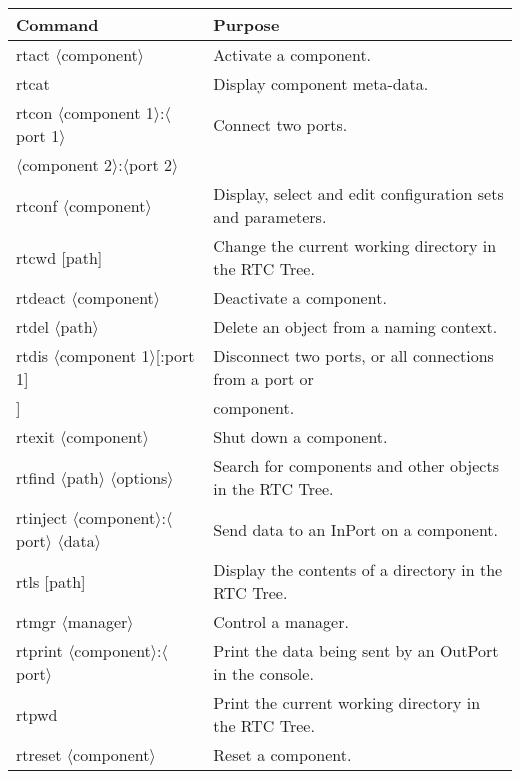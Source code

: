 \documentclass[a4paper,10pt]{article}
\newenvironment{Japanese}{%
  \CJKfamily{min}%
  \CJKtilde
  \CJKnospace}{}
\begin{document}

\begin{table}
  \centering
  \begin{tabularx}{\columnwidth}{ll}
    \toprule
    Command & Purpose \\
    \midrule
    rtact $\langle$component$\rangle$ & Activate a component. \\
    rtcat & Display component meta-data. \\
    rtcon $\langle$component 1$\rangle$:$\langle$port 1$\rangle$ & Connect two ports. \\
    \qquad$\langle$component 2$\rangle$:$\langle$port 2$\rangle$ & \\
    rtconf $\langle$component$\rangle$ & Display, select and edit configuration sets and parameters. \\
    rtcwd [path] & Change the current working directory in the RTC Tree. \\
    rtdeact $\langle$component$\rangle$ & Deactivate a component. \\
    rtdel $\langle$path$\rangle$ & Delete an object from a naming context. \\
    rtdis $\langle$component 1$\rangle$[:port 1] & Disconnect two ports, or all connections from a port or \\
    \qquad[component 2[:port 2]] & component. \\
    rtexit $\langle$component$\rangle$ & Shut down a component. \\
    rtfind $\langle$path$\rangle$ $\langle$options$\rangle$ & Search for components and other objects in the RTC Tree. \\
    rtinject $\langle$component$\rangle$:$\langle$port$\rangle$ $\langle$data$\rangle$ & Send data to an InPort on a component. \\
    rtls [path] & Display the contents of a directory in the RTC Tree. \\
    rtmgr $\langle$manager$\rangle$ & Control a manager. \\
    rtprint $\langle$component$\rangle$:$\langle$port$\rangle$ & Print the data being sent by an OutPort in the console. \\
    rtpwd & Print the current working directory in the RTC Tree. \\
    rtreset $\langle$component$\rangle$ & Reset a component. \\
    \bottomrule
  \end{tabularx}
\end{table}
\end{document}
